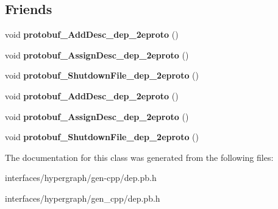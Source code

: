 \subsection*{Friends}
\begin{DoxyCompactItemize}
\item 
\hypertarget{classDep_a2e2e426fb93c4aaa0e5b3d0a15899d92}{
void {\bfseries protobuf\_\-AddDesc\_\-dep\_\-2eproto} ()}
\label{classDep_a2e2e426fb93c4aaa0e5b3d0a15899d92}

\item 
\hypertarget{classDep_ae60899dfa8b3c6020f8e19070804c43b}{
void {\bfseries protobuf\_\-AssignDesc\_\-dep\_\-2eproto} ()}
\label{classDep_ae60899dfa8b3c6020f8e19070804c43b}

\item 
\hypertarget{classDep_aab3c3b65c9043a8a41dcb95f310b49e8}{
void {\bfseries protobuf\_\-ShutdownFile\_\-dep\_\-2eproto} ()}
\label{classDep_aab3c3b65c9043a8a41dcb95f310b49e8}

\item 
\hypertarget{classDep_a2e2e426fb93c4aaa0e5b3d0a15899d92}{
void {\bfseries protobuf\_\-AddDesc\_\-dep\_\-2eproto} ()}
\label{classDep_a2e2e426fb93c4aaa0e5b3d0a15899d92}

\item 
\hypertarget{classDep_ae60899dfa8b3c6020f8e19070804c43b}{
void {\bfseries protobuf\_\-AssignDesc\_\-dep\_\-2eproto} ()}
\label{classDep_ae60899dfa8b3c6020f8e19070804c43b}

\item 
\hypertarget{classDep_aab3c3b65c9043a8a41dcb95f310b49e8}{
void {\bfseries protobuf\_\-ShutdownFile\_\-dep\_\-2eproto} ()}
\label{classDep_aab3c3b65c9043a8a41dcb95f310b49e8}

\end{DoxyCompactItemize}


The documentation for this class was generated from the following files:\begin{DoxyCompactItemize}
\item 
interfaces/hypergraph/gen-\/cpp/dep.pb.h\item 
interfaces/hypergraph/gen\_\-cpp/dep.pb.h\end{DoxyCompactItemize}
